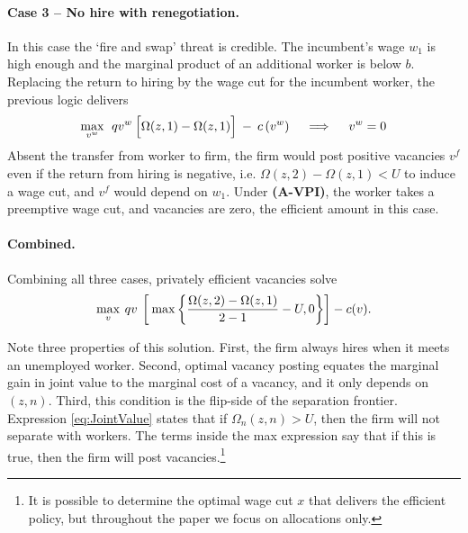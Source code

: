 \vspace*{-.2cm}\paragraph{Case 3 -- No hire with renegotiation.}

In this case the `fire and swap' threat is credible. The incumbent's wage $w_1$ is high enough and the marginal product of an additional worker is below $b$. Replacing the return to hiring by the wage cut for the incumbent worker, the previous logic delivers 
\vspace*{-.3cm}\begin{equation*}
\max_{v^{w}}\:\:qv^{w}\:\Big[\Omega(z,1)-\Omega(z,1) \Big]\:-\: c\left(v^{w}\right)\quad\implies\quad v^w = 0
\vspace*{-.3cm}\end{equation*}
Absent the transfer from worker to firm, the firm would post positive vacancies $v^f$ even if the return from hiring is negative, i.e. $\Omega(z,2)-\Omega(z,1)<U$ to induce a wage cut, and $v^f$ would depend on $w_1$.
Under \textbf{(A-VPI)}, the worker takes a preemptive wage cut, and vacancies are zero, the efficient amount in this case.

\vspace*{-.2cm}\paragraph{Combined.}
Combining all three cases, 
privately efficient vacancies solve
\vspace*{-.3cm}\begin{equation*}
\max_{v}\: qv\:\left[\:\max\left\{ \frac{\Omega(z,2)-\Omega(z,1)}{2-1}-U,0\right\}\right] - c(v).
\vspace*{-.3cm}\end{equation*}

Note three properties of this solution.
First, the firm always hires when it meets an unemployed worker. Second, optimal vacancy posting equates the marginal gain in joint value to the marginal cost of a vacancy, and it only depends on $(z,n)$. Third, this condition is the flip-side of the separation frontier.
Expression \eqref{eq:JointValue} states that if $\Omega_n(z,n)> U$, then the firm will not separate with workers.
The terms inside the max expression say that if this is true, then the firm will post vacancies.\footnote{
    It is possible to determine the optimal wage cut $x$ that delivers the efficient policy, but throughout the paper we focus on allocations only.
    }

